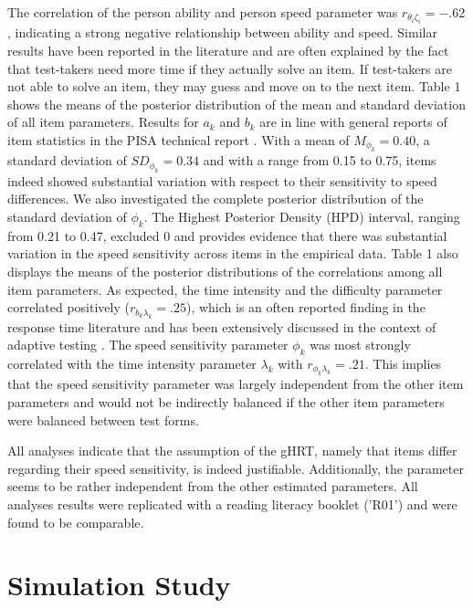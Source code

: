 \documentclass[a4paper,man,apacite,floatsintext,donotrepeattitle]{apa6}
\begin{document}
The correlation of the person ability and person speed parameter was $r_{\theta_{i}  \zeta_{i}} = -.62$, indicating a strong negative relationship between ability and speed. Similar results have been reported in the literature \cite<see also,>{Debelak.2014,Goldhammer.2011,Scherer.2015} and are often explained by the fact that test-takers need more time if they actually solve an item. If test-takers are not able to solve an item, they may guess and move on to the next item. Table 1 shows the means of the posterior distribution of the mean and standard deviation of all item parameters. Results for $a_{k}$ and $b_{k}$ are in line with general reports of item statistics in the PISA technical report \cite{PISA.2015results}. With a mean of $M_{\phi_k} = 0.40$, a standard deviation of $SD_{\phi_k} = 0.34$ and with a range from 0.15 to 0.75, items indeed showed substantial variation with respect to their sensitivity to speed differences. We also investigated the complete posterior distribution of the standard deviation of $\phi_{k}$.  The Highest Posterior Density (HPD) interval, ranging from 0.21 to 0.47, excluded 0 and provides evidence that there was substantial variation in the speed sensitivity across items in the empirical data. Table 1 also displays the means of the posterior distributions of the correlations among all item parameters. As expected, the time intensity and the difficulty parameter correlated positively ($r_{b_{k}  \lambda_{k}} = .25$), which is an often reported finding in the response time literature and has been extensively discussed in the context of adaptive testing \cite{vanderLinden.2013}. The speed sensitivity parameter $\phi_{k}$ was most strongly correlated with the time intensity parameter $\lambda_{k}$ with $r_{\phi_{k}  \lambda_{k}} = .21$. This implies that the speed sensitivity parameter was largely independent from the other item parameters and would not be indirectly balanced if the other item parameters were balanced between test forms.

All analyses indicate that the assumption of the gHRT, namely that items differ regarding their speed sensitivity, is indeed justifiable. Additionally, the parameter seems to be rather independent from the other estimated parameters. All analyses results were replicated with a reading literacy booklet ('R01') and were found to be comparable. 

\section{Simulation Study}
\end{document}
